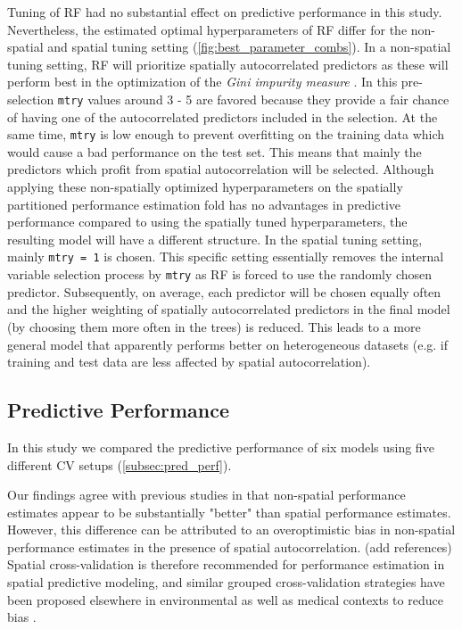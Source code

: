 \documentclass[review]{elsarticle}
\begin{document}
Tuning of RF had no substantial effect on predictive performance in this study.
Nevertheless, the estimated optimal hyperparameters of RF differ for the non-spatial and spatial tuning setting (\autoref{fig:best_parameter_combs}).
In a non-spatial tuning setting, RF will prioritize spatially autocorrelated predictors as these will perform best in the optimization of the \textit{Gini impurity measure} \citep{Biau2016, Gordon1984}.
In this pre-selection \texttt{mtry} values around 3 - 5 are favored because they provide a fair chance of having one of the autocorrelated predictors included in the selection.
At the same time, \texttt{mtry} is low enough to prevent overfitting on the training data which would cause a bad performance on the test set.
This means that mainly the predictors which profit from spatial autocorrelation will be selected.
Although applying these non-spatially optimized hyperparameters on the spatially partitioned performance estimation fold has no advantages in predictive performance compared to using the spatially tuned hyperparameters, the resulting model will have a different structure.
In the spatial tuning setting, mainly \texttt{mtry = 1} is chosen.
This specific setting essentially removes the internal variable selection process by \texttt{mtry} as RF is forced to use the randomly chosen predictor.
Subsequently, on average, each predictor will be chosen equally often and the higher weighting of spatially autocorrelated predictors in the final model (by choosing them more often in the trees) is reduced.
This leads to a more general model that apparently performs better on heterogeneous datasets (e.g. if training and test data are less affected by spatial autocorrelation).

\subsection{Predictive Performance}

In this study we compared the predictive performance of six models using five different \ac{CV} setups (\autoref{subsec:pred_perf}).

Our findings agree with previous studies in that non-spatial performance estimates appear to be substantially "better" than spatial performance estimates.
However, this difference can be attributed to an overoptimistic bias in non-spatial performance estimates in the presence of spatial autocorrelation. (add references)
Spatial cross-validation is therefore recommended for performance estimation in spatial predictive modeling, and similar grouped cross-validation strategies have been proposed elsewhere in environmental as well as medical contexts to reduce bias \citep{Brenning2008, Meyer2018, Pena2015}.
\end{document}
